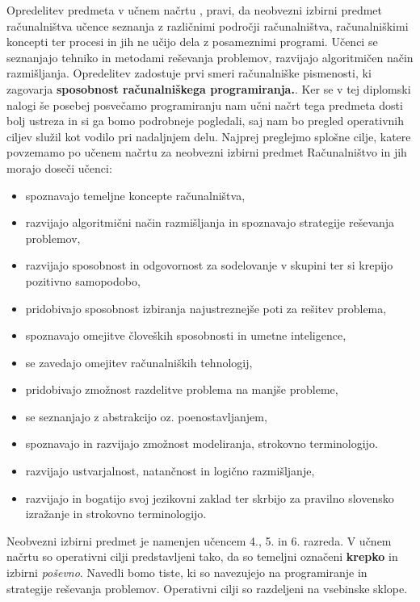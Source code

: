 Opredelitev predmeta v učnem načrtu
\cite{ucni_nacrt-neobvezni-izbirni-os}, pravi, da neobvezni izbirni
predmet računalništva učence seznanja z različnimi področji
računalništva, računalniškimi koncepti ter procesi in jih ne učijo
dela z posameznimi programi. Učenci se seznanjajo tehniko in metodami
reševanja problemov, razvijajo algoritmičen način
razmišljanja. Opredelitev zadostuje prvi smeri računalniške
pismenosti, ki zagovarja \textbf{sposobnost računalniškega
  programiranja.}. Ker se v tej diplomski nalogi še posebej posvečamo
programiranju nam učni načrt tega predmeta dosti bolj ustreza in si ga
bomo podrobneje pogledali, saj nam bo pregled operativnih ciljev
služil kot vodilo pri nadaljnjem delu.  Najprej preglejmo splošne
cilje, katere povzemamo po učenem načrtu za neobvezni izbirni predmet
Računalništvo \cite{ucni_nacrt-neobvezni-izbirni-os} in jih morajo
doseči učenci:
\begin{itemize}
\tightlist
\item spoznavajo temeljne koncepte računalništva,
\item razvijajo algoritmični način razmišljanja in spoznavajo
  strategije reševanja problemov,
\item razvijajo sposobnost in odgovornost za sodelovanje v skupini ter
  si krepijo pozitivno samopodobo,
\item pridobivajo sposobnost izbiranja najustreznejše poti za rešitev
  problema,
\item  spoznavajo omejitve človeških sposobnosti in umetne
  inteligence,
\item se zavedajo omejitev računalniških tehnologij,
\item pridobivajo zmožnost razdelitve problema na manjše probleme,
\item se seznanjajo z abstrakcijo oz. poenostavljanjem,
\item spoznavajo in razvijajo zmožnost modeliranja, strokovno
  terminologijo.
\item  razvijajo ustvarjalnost, natančnost in logično razmišljanje,
\item razvijajo in bogatijo svoj jezikovni zaklad ter skrbijo za
  pravilno slovensko izražanje in strokovno terminologijo.
\end{itemize}

Neobvezni izbirni predmet je namenjen učencem 4., 5. in 6. razreda. V
učnem načrtu so operativni cilji predstavljeni tako, da so temeljni
označeni \textbf{krepko} in izbirni \emph{poševno}. Navedli bomo
tiste, ki so navezujejo na programiranje in strategije reševanja
problemov. Operativni cilji so razdeljeni na vsebinske sklope.

